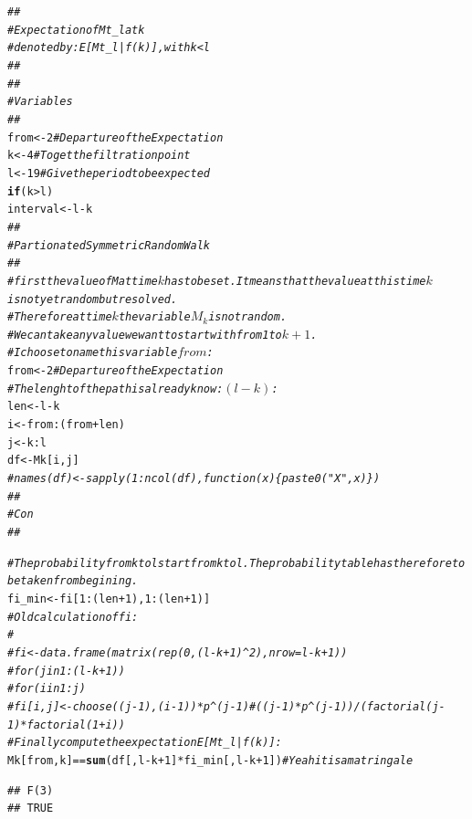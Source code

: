 \documentclass{article}\usepackage[]{graphicx}\usepackage[]{color}
\makeatletter
\newcommand{\hlnum}[1]{\textcolor[rgb]{0.686,0.059,0.569}{#1}}%
\newcommand{\hlcom}[1]{\textcolor[rgb]{0.678,0.584,0.686}{\textit{#1}}}%
\newcommand{\hlopt}[1]{\textcolor[rgb]{0,0,0}{#1}}%
\newcommand{\hlstd}[1]{\textcolor[rgb]{0.345,0.345,0.345}{#1}}%
\newcommand{\hlkwa}[1]{\textcolor[rgb]{0.161,0.373,0.58}{\textbf{#1}}}%
\newcommand{\hlkwb}[1]{\textcolor[rgb]{0.69,0.353,0.396}{#1}}%
\newcommand{\hlkwd}[1]{\textcolor[rgb]{0.737,0.353,0.396}{\textbf{#1}}}%
\newenvironment{kframe}{%
 \def\at@end@of@kframe{}%
 \ifinner\ifhmode%
  \def\at@end@of@kframe{\end{minipage}}%
  \begin{minipage}{\columnwidth}%
 \fi\fi%
 \def\FrameCommand##1{\hskip\@totalleftmargin \hskip-\fboxsep
 \colorbox{shadecolor}{##1}\hskip-\fboxsep
     \hskip-\linewidth \hskip-\@totalleftmargin \hskip\columnwidth}%
 \MakeFramed {\advance\hsize-\width
   \@totalleftmargin\z@ \linewidth\hsize
   \@setminipage}}%
 {\par\unskip\endMakeFramed%
 \at@end@of@kframe}
\newenvironment{knitrout}{}{} %
\makeatother
\begin{document}
\begin{knitrout}
\color{fgcolor}\begin{kframe}
\begin{alltt}
 \hlcom{##}
\hlcom{# Expectation of Mt_l at k}
\hlcom{# denoted by: E[Mt_l|f(k)], with k < l}
\hlcom{##}
\hlcom{##}
\hlcom{# Variables}
\hlcom{##}
\hlstd{from} \hlkwb{<-} \hlnum{2} \hlcom{# Departure of the Expectation}
\hlstd{k} \hlkwb{<-} \hlnum{4} \hlcom{# To get the filtration point }
\hlstd{l} \hlkwb{<-} \hlnum{19} \hlcom{# Give the period to be expected}
\hlkwa{if}\hlstd{(k}\hlopt{>}\hlstd{l)}
\hlstd{interval} \hlkwb{<-} \hlstd{l}\hlopt{-}\hlstd{k}
\hlcom{##}
\hlcom{# Partionated Symmetric Random Walk}
\hlcom{##}
\hlcom{# first the value of M at time $k$ has to be set. It means that the value at this time $k$ is not yet random but resolved.}
\hlcom{# Therefore at time $k$ the variable $M_k$ is not random. }
\hlcom{# We can take any value we want to start with from 1 to $k + 1$.}
\hlcom{# I choose to name this variable $from$:}
\hlstd{from} \hlkwb{<-} \hlnum{2} \hlcom{# Departure of the Expectation}
\hlcom{# The lenght of the path is already know: $(l - k)$:}
\hlstd{len} \hlkwb{<-} \hlstd{l} \hlopt{-} \hlstd{k}
\hlstd{i} \hlkwb{<-} \hlstd{from}\hlopt{:}\hlstd{(from} \hlopt{+} \hlstd{len)}
\hlstd{j} \hlkwb{<-} \hlstd{k}\hlopt{:}\hlstd{l}
\hlstd{df} \hlkwb{<-} \hlstd{Mk[i, j]}
\hlcom{# names(df) <- sapply(1:ncol(df), function(x)\{paste0("X",x)\})}
\hlcom{##}
\hlcom{# Con }
\hlcom{##}

\hlcom{# The probability from k to l start from k to l. The probability table has therefore to be taken from begining.}
\hlstd{fi_min} \hlkwb{<-} \hlstd{fi[}\hlnum{1}\hlopt{:}\hlstd{(len}\hlopt{+}\hlnum{1}\hlstd{),} \hlnum{1}\hlopt{:}\hlstd{(len}\hlopt{+}\hlnum{1}\hlstd{)]}
\hlcom{# Old calculation of fi:}
\hlcom{# }
\hlcom{# fi <- data.frame(matrix(rep(0, (l-k + 1)^2), nrow = l-k + 1))}
\hlcom{# for(j in 1:(l-k+1))}
\hlcom{#   for(i in 1:j)}
\hlcom{#     fi[i, j] <- choose((j-1), (i-1)) * p^(j-1)#((j-1)*p^(j-1))/(factorial(j-1)*factorial(1+i))}
\hlcom{# Finally compute the expectation E[Mt_l|f(k)]:}
\hlstd{Mk[from, k]} \hlopt{==} \hlkwd{sum}\hlstd{(df[, l}\hlopt{-}\hlstd{k}\hlopt{+}\hlnum{1}\hlstd{]} \hlopt{*} \hlstd{fi_min[, l}\hlopt{-}\hlstd{k}\hlopt{+}\hlnum{1}\hlstd{])} \hlcom{#Yeah it is a matringale}
\end{alltt}
\begin{verbatim}
## F(3) 
## TRUE
\end{verbatim}
\end{kframe}
\end{knitrout}



 
           
\end{document}
